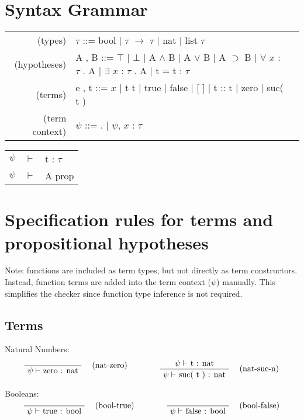 \documentclass[twoside,a4paper]{article}
\theoremstyle{definition}
\begin{document}
\maketitle

\section{Syntax Grammar}
\begin{center}
\begin{tabular}{rll}
(types)& $\tau$ ::= bool
| $\tau$ $\rightarrow$ $\tau $ | nat | list $\tau$
\\
(hypotheses)& A , B ::= $\top$ | $\bot$
| A $\wedge$ B | A $\vee$ B | A $\supset$ B
| $\forall$ $x$ : $\tau$ . A | $\exists$ $x$ : $\tau$ . A
| t = t : $\tau$
\\
(terms)& e , t ::= $x$ | t t | true | false
| [ ] | t :: t  %
| zero | suc( t ) %
\\
(term context)& $\psi$ ::= . | $\psi$, $x$ : $\tau$
\end{tabular}

\begin{tabular}{rll}
$\psi$ &$\vdash$ & t : $\tau$\\
$\psi$ &$\vdash$ & A prop
\end{tabular}
\end{center}

\section{Specification rules for terms and propositional hypotheses}

Note: functions are included as term types, but not directly as term constructors. Instead, function terms are added into the term context ($\psi$) manually. This simplifies the checker since function type inference is not required.

\subsection{Terms}
Natural Numbers:
\[
\AxiomC{}
\RightLabel{\quad (nat-zero)}
\UnaryInfC{$\psi \vdash$ zero : nat}
\DisplayProof
\qquad
\qquad
\AxiomC{$\psi \vdash$ t : nat}
\RightLabel{\quad (nat-suc-n)}
\UnaryInfC{$\psi \vdash$ suc( t ) : nat}
\DisplayProof
\]

Booleans:
\[
\AxiomC{}
\RightLabel{\quad (bool-true)}
\UnaryInfC{$\psi \vdash$ true : bool}
\DisplayProof
\qquad
\qquad
\AxiomC{}
\RightLabel{\quad (bool-false)}
\UnaryInfC{$\psi \vdash$ false : bool}
\DisplayProof
\]
\end{document}
